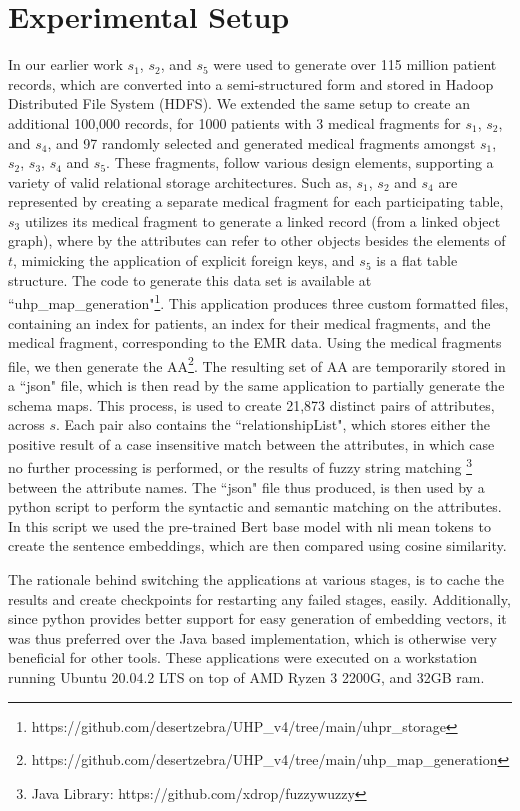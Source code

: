 
\section*{Experimental Setup}
\label{experimentalSetup}
In our earlier work \cite{Satti2020} $s_1$, $s_2$, and $s_5$ were used to generate over 115 million patient records, which are converted into a semi-structured form and stored in Hadoop Distributed File System (HDFS). We extended the same setup to create an additional 100,000 records, for 1000 patients with 3 medical fragments for $s_1$, $s_2$, and $s_4$, and 97 randomly selected and generated medical fragments amongst $s_1$, $s_2$, $s_3$, $s_4$ and $s_5$. These fragments, follow various design elements, supporting a variety of valid relational storage architectures. Such as, $s_1$, $s_2$ and $s_4$ are represented by creating a separate medical fragment for each participating table, $s_3$ utilizes its medical fragment to generate a linked record (from a linked object graph), where by the attributes can refer to other objects besides the elements of $t$, mimicking the application of explicit foreign keys, and $s_5$ is a flat table structure. The code to generate this data set is available at ``uhp\_map\_generation"\footnote{https://github.com/desertzebra/UHP\_v4/tree/main/uhpr\_storage}. This application produces three custom formatted files, containing an index for patients, an index for their medical fragments, and the medical fragment, corresponding to the EMR data. Using the medical fragments file, we then generate the AA\footnote{https://github.com/desertzebra/UHP\_v4/tree/main/uhp\_map\_generation}. The resulting set of AA are temporarily stored in a ``json" file, which is then read by the same application to partially generate the schema maps. This process, is used to create 21,873  distinct pairs of attributes, across $s$. Each pair also contains the ``relationshipList", which stores either the positive result of a case insensitive match between the attributes, in which case no further processing is performed, or the results of fuzzy string matching\cite{FuzzyWuzzy} \footnote{Java Library: https://github.com/xdrop/fuzzywuzzy} between the attribute names. 
The ``json" file thus produced, is then used by a python script to perform the syntactic and semantic matching on the attributes. In this script we used the pre-trained Bert base model with nli mean tokens\cite{reimers-2019-sentence-bert} to create the sentence embeddings, which are then compared using cosine similarity. 

The rationale behind switching the applications at various stages, is to cache the results and create checkpoints for restarting any failed stages, easily. Additionally, since python provides better support for easy generation of embedding vectors, it was thus preferred over the Java based implementation, which is otherwise very beneficial for other tools. These applications were executed on a workstation running Ubuntu 20.04.2 LTS on top of AMD Ryzen 3 2200G, and 32GB ram.

